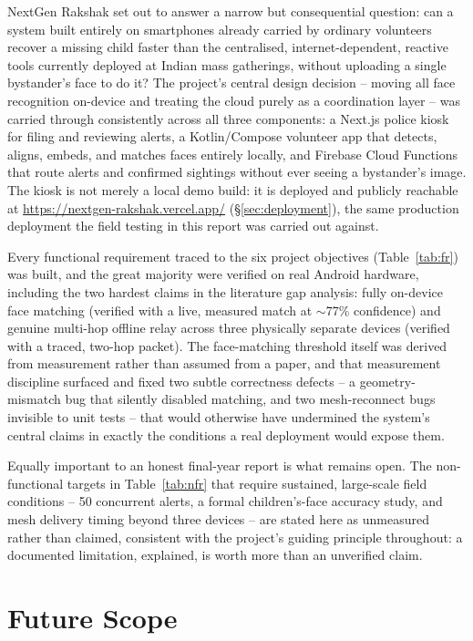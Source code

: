 \documentclass[12pt,a4paper,oneside]{report}
\begin{document}
NextGen Rakshak set out to answer a narrow but consequential question: can a
system built entirely on smartphones already carried by ordinary volunteers
recover a missing child faster than the centralised, internet-dependent,
reactive tools currently deployed at Indian mass gatherings, without
uploading a single bystander's face to do it? The project's central design
decision -- moving all face recognition on-device and treating the cloud
purely as a coordination layer -- was carried through consistently across
all three components: a Next.js police kiosk for filing and reviewing
alerts, a Kotlin/Compose volunteer app that detects, aligns, embeds, and
matches faces entirely locally, and Firebase Cloud Functions that route
alerts and confirmed sightings without ever seeing a bystander's image.
The kiosk is not merely a local demo build: it is deployed and publicly
reachable at \url{https://nextgen-rakshak.vercel.app/} (\S\ref{sec:deployment}),
the same production deployment the field testing in this report was
carried out against.

Every functional requirement traced to the six project objectives
(Table~\ref{tab:fr}) was built, and the great majority were verified on
real Android hardware, including the two hardest claims in the literature
gap analysis: fully on-device face matching (verified with a live,
measured match at $\sim$77\% confidence) and genuine multi-hop offline
relay across three physically separate devices (verified with a traced,
two-hop packet). The face-matching threshold itself was derived from
measurement rather than assumed from a paper, and that measurement
discipline surfaced and fixed two subtle correctness defects -- a
geometry-mismatch bug that silently disabled matching, and two
mesh-reconnect bugs invisible to unit tests -- that would otherwise have
undermined the system's central claims in exactly the conditions a real
deployment would expose them.

Equally important to an honest final-year report is what remains open. The
non-functional targets in Table~\ref{tab:nfr} that require sustained,
large-scale field conditions -- 50 concurrent alerts, a formal children's-face
accuracy study, and mesh delivery timing beyond three devices -- are stated
here as unmeasured rather than claimed, consistent with the project's
guiding principle throughout: a documented limitation, explained, is worth
more than an unverified claim.

\section{Future Scope}
\end{document}
